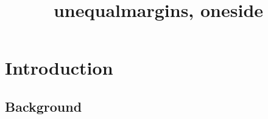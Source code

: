 \documentclass[
  unequalmargins,
  oneside,
  a5paper,
]{ut-thesis}
\title{unequalmargins, oneside}
\begin{document}
  \maketitle
  \chapter{Introduction}
  \lipsum[1-2]
  \section{Background}
  \lipsum[3-4]
\end{document}
